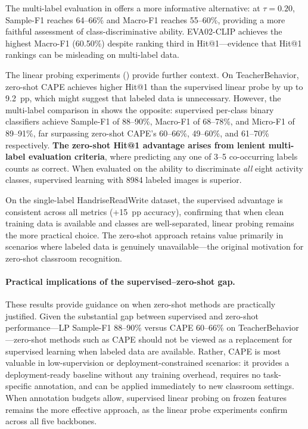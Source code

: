 \documentclass[symmetry,article,submit,pdftex,moreauthors]{Definitions/mdpi}
\begin{document}
The multi-label evaluation in  offers a more informative alternative: at $\tau=0.20$, Sample-F1 reaches 64--66\% and Macro-F1 reaches 55--60\%, providing a more faithful assessment of class-discriminative ability. EVA02-CLIP achieves the highest Macro-F1 (60.50\%) despite ranking third in Hit@1---evidence that Hit@1 rankings can be misleading on multi-label data.

The linear probing experiments () provide further context. On TeacherBehavior, zero-shot CAPE achieves higher Hit@1 than the supervised linear probe by up to 9.2~pp, which might suggest that labeled data is unnecessary. However, the multi-label comparison in  shows the opposite: supervised per-class binary classifiers achieve Sample-F1 of 88--90\%, Macro-F1 of 68--78\%, and Micro-F1 of 89--91\%, far surpassing zero-shot CAPE's 60--66\%, 49--60\%, and 61--70\% respectively. \textbf{The zero-shot Hit@1 advantage arises from lenient multi-label evaluation criteria}, where predicting any one of 3--5 co-occurring labels counts as correct. When evaluated on the ability to discriminate \emph{all} eight activity classes, supervised learning with 8984 labeled images is superior.

On the single-label HandriseReadWrite dataset, the supervised advantage is consistent across all metrics (+15~pp accuracy), confirming that when clean training data is available and classes are well-separated, linear probing remains the more practical choice. The zero-shot approach retains value primarily in scenarios where labeled data is genuinely unavailable---the original motivation for zero-shot classroom recognition.

\paragraph{Practical implications of the supervised--zero-shot gap.}
These results provide guidance on when zero-shot methods are practically justified. Given the substantial gap between supervised and zero-shot performance---LP Sample-F1 88--90\% versus CAPE 60--66\% on TeacherBehavior---zero-shot methods such as CAPE should not be viewed as a replacement for supervised learning when labeled data are available. Rather, CAPE is most valuable in low-supervision or deployment-constrained scenarios: it provides a deployment-ready baseline without any training overhead, requires no task-specific annotation, and can be applied immediately to new classroom settings. When annotation budgets allow, supervised linear probing on frozen features remains the more effective approach, as the linear probe experiments confirm across all five backbones.
\end{document}
